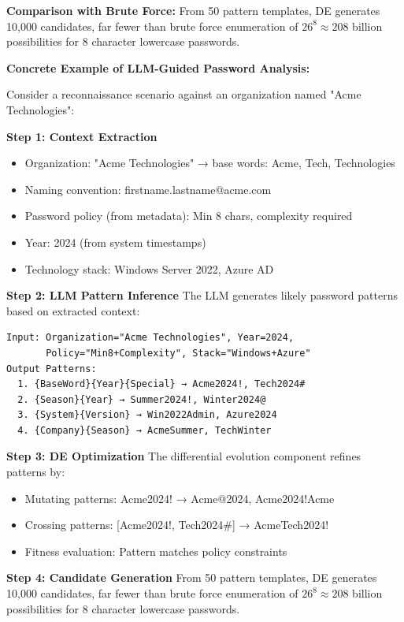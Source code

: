 \documentclass[preprint,12pt]{elsarticle}
\begin{document}
\textbf{Comparison with Brute Force:} From 50 pattern templates, DE generates 10,000 candidates, far fewer than brute force enumeration of $26^{8} \approx 208$ billion possibilities for 8 character lowercase passwords.

\textbf{Concrete Example of LLM-Guided Password Analysis:}

Consider a reconnaissance scenario against an organization named "Acme Technologies":

\textbf{Step 1: Context Extraction}
\begin{itemize}
    \item Organization: "Acme Technologies" → base words: Acme, Tech, Technologies
    \item Naming convention: firstname.lastname@acme.com
    \item Password policy (from metadata): Min 8 chars, complexity required
    \item Year: 2024 (from system timestamps)
    \item Technology stack: Windows Server 2022, Azure AD
\end{itemize}

\textbf{Step 2: LLM Pattern Inference}
The LLM generates likely password patterns based on extracted context:
\begin{verbatim}
Input: Organization="Acme Technologies", Year=2024,
       Policy="Min8+Complexity", Stack="Windows+Azure"
Output Patterns:
  1. {BaseWord}{Year}{Special} → Acme2024!, Tech2024#
  2. {Season}{Year} → Summer2024!, Winter2024@
  3. {System}{Version} → Win2022Admin, Azure2024
  4. {Company}{Season} → AcmeSummer, TechWinter
\end{verbatim}

\textbf{Step 3: DE Optimization}
The differential evolution component refines patterns by:
\begin{itemize}
    \item Mutating patterns: Acme2024! → Acme@2024, Acme2024!Acme
    \item Crossing patterns: [Acme2024!, Tech2024#] → AcmeTech2024!
    \item Fitness evaluation: Pattern matches policy constraints
\end{itemize}

\textbf{Step 4: Candidate Generation}
From 50 pattern templates, DE generates 10,000 candidates, far fewer than brute force enumeration of $26^{8} \approx 208$ billion possibilities for 8 character lowercase passwords.
\end{document}
